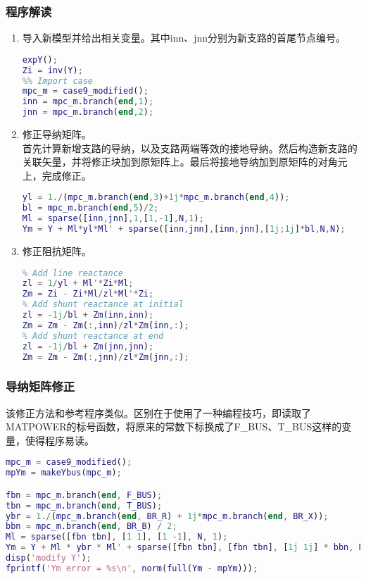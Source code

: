 \documentclass[a4paper,12pt]{article}
\begin{document}
    \subsubsection{程序解读}
    \begin{enumerate}
      \item 导入新模型并给出相关变量。其中inn、jnn分别为新支路的首尾节点编号。
      \begin{lstlisting}[language=matlab]
%% previous
expY();
Zi = inv(Y);
%% Import case
mpc_m = case9_modified();
inn = mpc_m.branch(end,1);
jnn = mpc_m.branch(end,2);
      \end{lstlisting}
      \item 修正导纳矩阵。\\
      首先计算新增支路的导纳，以及支路两端等效的接地导纳。然后构造新支路的关联矢量，并将修正块加到原矩阵上。最后将接地导纳加到原矩阵的对角元上，完成修正。
      \begin{lstlisting}[language=matlab]
%% Modify Y
yl = 1./(mpc_m.branch(end,3)+1j*mpc_m.branch(end,4));
bl = mpc_m.branch(end,5)/2;
Ml = sparse([inn,jnn],1,[1,-1],N,1);
Ym = Y + Ml*yl*Ml' + sparse([inn,jnn],[inn,jnn],[1j;1j]*bl,N,N);
      \end{lstlisting}
      \item 修正阻抗矩阵。\\
      
      \begin{lstlisting}[language=matlab]
%% Modify Z
% Add line reactance
zl = 1/yl + Ml'*Zi*Ml;
Zm = Zi - Zi*Ml/zl*Ml'*Zi;
% Add shunt reactance at initial
zl = -1j/bl + Zm(inn,inn);
Zm = Zm - Zm(:,inn)/zl*Zm(inn,:);
% Add shunt reactance at end
zl = -1j/bl + Zm(jnn,jnn);
Zm = Zm - Zm(:,jnn)/zl*Zm(jnn,:);
      \end{lstlisting}
    \end{enumerate}
    \subsubsection{导纳矩阵修正}
    该修正方法和参考程序类似。区别在于使用了一种编程技巧，即读取了MATPOWER的标号函数，将原来的常数下标换成了F_BUS、T_BUS这样的变量，使得程序易读。
    \begin{lstlisting}[language=matlab,label=lst:q2q1p1,caption={导纳矩阵修正程序}]
%% Modify Y
mpc_m = case9_modified();
mpYm = makeYbus(mpc_m);

fbn = mpc_m.branch(end, F_BUS);
tbn = mpc_m.branch(end, T_BUS);
ybr = 1./(mpc_m.branch(end, BR_R) + 1j*mpc_m.branch(end, BR_X));
bbn = mpc_m.branch(end, BR_B) / 2;
Ml = sparse([fbn tbn], [1 1], [1 -1], N, 1);
Ym = Y + Ml * ybr * Ml' + sparse([fbn tbn], [fbn tbn], [1j 1j] * bbn, N, N);
disp('modify Y');
fprintf('Ym error = %s\n', norm(full(Ym - mpYm)));
    \end{lstlisting}
\end{document}
